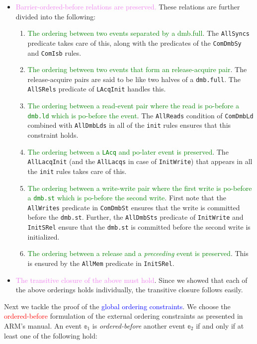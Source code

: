 \documentclass{article}
\begin{document}
\begin{itemize}
    \item  \textcolor{violet}{Barrier-ordered-before relations are preserved.} These relations are further divided into the following:
    \begin{enumerate}
        \setlength\itemsep{0em}
        \item \textcolor{green}{The ordering between two events separated by a dmb.full}. The \texttt{AllSyncs} predicate takes care of this, along with the predicates of the \texttt{ComDmbSy} and \texttt{ComIsb} rules.
        \item \textcolor{green}{The ordering between two events that form an release-acquire pair}. The release-acquire pairs are said to be like two halves of a \texttt{dmb.full}. The \texttt{AllSRels} predicate of \texttt{LAcqInit} handles this.
        \item \textcolor{green}{The ordering between a read-event pair where the read is po-before a \texttt{dmb.ld} which is po-before the event}. The \texttt{AllReads} condition of \texttt{ComDmbLd} combined with \texttt{AllDmbLds} in all of the \texttt{init} rules ensures that this constraint holds.
        \item \textcolor{green}{The ordering between a \texttt{LAcq} and po-later event is preserved}. The \texttt{AllLacqInit} (and the \texttt{AllLacqs} in case of \texttt{InitWrite}) that appears in all the \texttt{init} rules takes care of this.
        \item \textcolor{green}{The ordering between a write-write pair where the first write is po-before a \texttt{dmb.st} which is po-before the second write}. First note that the \texttt{AllWrites} predicate in \texttt{ComDmbSt} ensures that the write is committed before the \texttt{dmb.st}. Further, the \texttt{AllDmbSts} predicate of \texttt{InitWrite} and \texttt{InitSRel} ensure that the \texttt{dmb.st} is committed before the second write is initialized.
        \item \textcolor{green}{The ordering between a release and a \textit{preceeding} event is preserved}. This is ensured by the \texttt{AllMem} predicate in \texttt{InitSRel}.
    \end{enumerate}
    \item \textcolor{violet}{The transitive closure of the above must hold}. Since we showed that each of the above orderings holds individually, the transitive closure follows easily.
\end{itemize}
Next we tackle the proof of the \textcolor{blue}{global ordering constraints}. We choose the \textcolor{red}{ordered-before} formulation of the external ordering constraints as presented in ARM's manual. An event $\mathbb{e}_1$ is \textit{ordered-before} another event $\mathbb{e}_2$ if and only if at least one of the following hold:
\end{document}
